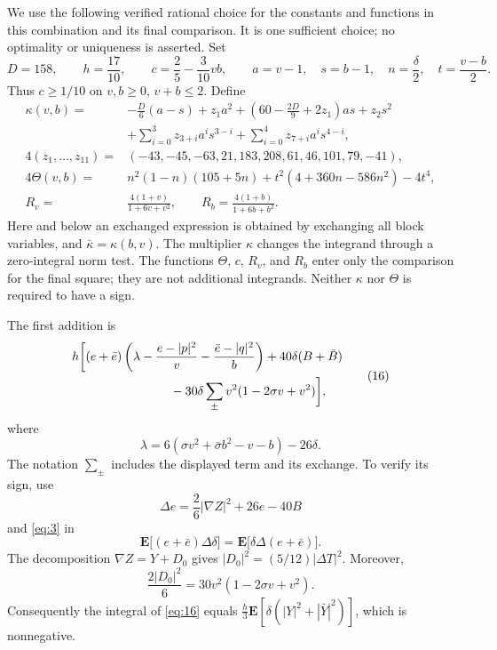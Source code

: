 We use the following verified rational choice for the constants and
functions in this combination and its final comparison. It is one
sufficient choice; no optimality or uniqueness is asserted.
Set
\[
 D=158,\qquad h=\frac{17}{10},\qquad
 c=\frac25-\frac3{10}vb,
 \qquad a=v-1,\quad s=b-1,\quad
 n=\frac\delta2,\quad t=\frac{v-b}{2}.
\]
Thus $c\ge 1/10$ on $v,b\ge0$, $v+b\le2$. Define
\begin{equation}
\begin{aligned}
 \kappa(v,b)={}&-\frac D6(a-s)+z_1a^2
       +\left(60-\frac{2D}{9}+2z_1\right)as+z_2s^2\\
 &+\sum_{i=0}^3z_{3+i}a^is^{3-i}
       +\sum_{i=0}^4z_{7+i}a^is^{4-i},\\
 4(z_1,\ldots,z_{11})={}&
       (-43,-45,-63,21,183,208,61,46,101,79,-41),\\
 4\Theta(v,b)={}&n^2(1-n)(105+5n)
       +t^2(4+360n-586n^2)-4t^4,\\
 R_v={}&\frac{4(1+v)}{1+6v+v^2},\qquad
 R_b=\frac{4(1+b)}{1+6b+b^2}.
\end{aligned}
\tag{15}\label{eq:15}
\end{equation}
Here and below an exchanged expression is obtained by exchanging all
block variables, and $\bar\kappa=\kappa(b,v)$.
The multiplier $\kappa$ changes the integrand through a zero-integral
norm test. The functions $\Theta$, $c$, $R_v$, and $R_b$ enter only the
comparison for the final square; they are not additional integrands.
Neither $\kappa$ nor $\Theta$ is required to have a sign.

The first addition is
\begin{equation}
\begin{aligned}
 h\bigg[&(e+\bar e)
   \left(\lambda-\frac{e-|p|^2}{v}
                     -\frac{\bar e-|q|^2}{b}\right)
       +40\delta(B+\bar B)\\
 &\hspace{24mm}
       -30\delta\sum_{\pm}v^2(1-2\sigma v+v^2)\bigg],
\end{aligned}
\tag{16}\label{eq:16}
\end{equation}
where
\[
 \lambda=6(\sigma v^2+\bar\sigma b^2-v-b)-26\delta.
\]
The notation $\sum_\pm$ includes the displayed term and its exchange.
To verify its sign, use
\[
 \Delta e=\frac{2}{6}|\nabla Z|^2+26e-40B
\]
and \eqref{eq:3} in
\[
 \mathbf E\bigl[(e+\bar e)\Delta\delta\bigr]
 =\mathbf E\bigl[\delta\Delta(e+\bar e)\bigr].
\]
The decomposition $\nabla Z=Y+D_0$ gives
$|D_0|^2=(5/12)|\Delta T|^2$. Moreover,
\[
 \frac{2|D_0|^2}{6}
       =30v^2(1-2\sigma v+v^2).
\]
Consequently the integral of \eqref{eq:16} equals
$\frac h3\mathbf E[\delta(|Y|^2+|\bar Y|^2)]$, which is nonnegative.

